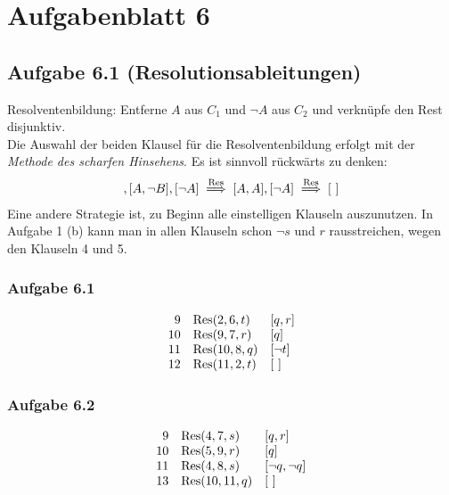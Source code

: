 
\section{Aufgabenblatt 6}
\subsection{Aufgabe 6.1 (Resolutionsableitungen)}
Resolventenbildung: Entferne $A$ aus $C_1$ und $\neg A$ aus $C_2$ und verknüpfe den Rest disjunktiv.\\
Die Auswahl der beiden Klausel für die Resolventenbildung erfolgt mit der \textit{Methode des scharfen Hinsehens}. 
Es ist sinnvoll rückwärts zu denken:
\begin{align*}
	[A,B],[A,\neg B],[\neg A]\Reso[A,A],[\neg A]\Reso[~]
\end{align*}
Eine andere Strategie ist, zu Beginn alle einstelligen Klauseln auszunutzen. 
In Aufgabe 1 (b) kann man in allen Klauseln schon $\neg s$ und $r$ rausstreichen, wegen den Klauseln 4 und 5.

\subsubsection{Aufgabe 6.1}
\begin{align*}
	\begin{array}{rll}
		9 & \operatorname{Res}(2,6,t) & [q,r]\\
		10 & \operatorname{Res}(9, 7,r) & [q]\\
		11 & \operatorname{Res}(10,8,q) & [\neg t]\\
		12 & \operatorname{Res}(11,2, t) & [~]
	\end{array}
\end{align*}

\subsubsection{Aufgabe 6.2}
\begin{align*}
	\begin{array}{rll}
		9 & \operatorname{Res}(4,7,s) & [q,r]\\
		10 & \operatorname{Res}(5,9,r) & [q]\\
		11 & \operatorname{Res}(4,8,s) & [\neg q,\neg q]\\
		13 & \operatorname{Res}(10,11,q) & [~]
	\end{array}
\end{align*}

